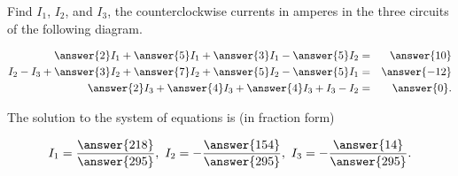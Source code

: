 \documentclass{ximera}
\author{Zack Reed}
\begin{document}
\begin{problem}

    Find $I_1$, $I_2$, and $I_3$, the counterclockwise currents in
    amperes in the three circuits of the following diagram.
  
    \begin{center}
    \end{center}
  
  
      \begin{eqnarray*}
        \answer{2}I_1 + \answer{5}I_1 + \answer{3}I_1 - \answer{5}I_2 &=& \answer{10} \\
        I_2 - I_3 + \answer{3}I_2 + \answer{7}I_2 + \answer{5}I_2 - \answer{5}I_1 &=& \answer{-12} \\
        \answer{2}I_3 + \answer{4}I_3 + \answer{4}I_3 + I_3 - I_2 &=& \answer{0}.
      \end{eqnarray*}

        The solution to the system of equations is (in fraction form)
  
      \begin{equation*}
        I_1 = \frac{\answer{218}}{\answer{295}},\quad
        I_2 = -\frac{\answer{154}}{\answer{295}},\quad
        I_3 = -\frac{\answer{14}}{\answer{295}}.
      \end{equation*}
  

\end{problem}
\end{document}
